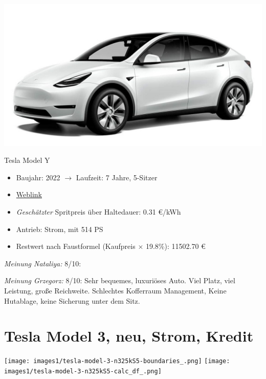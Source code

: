 \documentclass[landscape, DIV=99, 14pt]{scrartcl}
\begin{document}
\pagebreak
\begin{center}
\includegraphics[width=0.9\columnwidth]{cars/tesla-model-y.jpg}

Tesla Model Y
\end{center}

\begin{itemize}
    \item Baujahr: 2022 $\rightarrow$ Laufzeit: 7 Jahre, 5-Sitzer
    \item \href{https://www.tesla.com/de_de/modely/design\#overview}{Weblink}
    \item \emph{Gesch\"atzter} Spritpreis \"uber Haltedauer: 0.31 \euro{}/kWh
    \item Antrieb: Strom, mit 514 PS
    \item Restwert nach Faustformel (Kaufpreis $\times$ 19.8\%): 11502.70 \euro{}
\end{itemize}

\begin{small}
\emph{Meinung Nataliya:} 8/10: 
        
\emph{Meinung Grzegorz:} 8/10: Sehr bequemes, luxuri\"oses Auto. Viel Platz, viel Leistung, gro\ss{}e Reichweite. Schlechtes Kofferraum Management, Keine Hutablage, keine Sicherung unter dem Sitz.
\end{small}

\pagebreak


\twocolumn

\section*{Tesla Model 3, neu, Strom, Kredit}
\begin{center}
\texttt{[image: images1/tesla-model-3-n325kS5-boundaries\_.png]}
\null
\vspace{0.5cm}
\texttt{[image: images1/tesla-model-3-n325kS5-calc\_df\_.png]}
\end{center}
\end{document}
